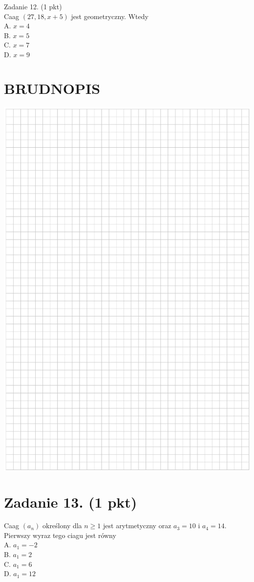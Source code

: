 \documentclass[10pt]{article}
\begin{document}
Zadanie 12. (1 pkt)\\
Caag \((27,18, x+5)\) jest geometryczny. Wtedy\\
A. \(x=4\)\\
B. \(x=5\)\\
C. \(x=7\)\\
D. \(x=9\)

\section*{BRUDNOPIS}
\begin{center}
\includegraphics[max width=\textwidth]{2024_11_21_e0e8aab895018a50a9a7g-05}
\end{center}

\section*{Zadanie 13. (1 pkt)}
Caag \(\left(a_{n}\right)\) określony dla \(n \geq 1\) jest arytmetyczny oraz \(a_{3}=10\) i \(a_{4}=14\). Pierwszy wyraz tego ciagu jest równy\\
A. \(a_{1}=-2\)\\
B. \(a_{1}=2\)\\
C. \(a_{1}=6\)\\
D. \(a_{1}=12\)
\end{document}
